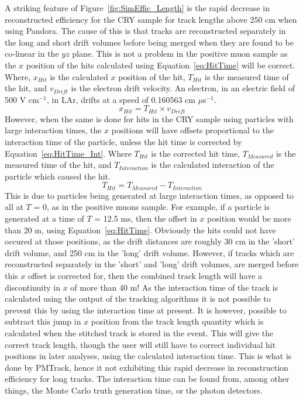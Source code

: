 A striking feature of Figure~\ref{fig:SimEffic_Length} is the rapid decrease in reconstructed efficiency for the CRY sample for track lengths above 250 cm when using Pandora. The cause of this is that tracks are reconstructed separately in the long and short drift volumes before being merged when they are found to be co-linear in the $yz$ plane. This is not a problem in the positive muon sample as the $x$ position of the hits calculated using Equation~\ref{eq:HitTime} will be correct. Where, $x_{Hit}$ is the calculated $x$ position of the hit, $T_{Hit}$ is the measured time of the hit, and $v_{Drift}$ is the electron drift velocity. An electron, in an electric field of 500 V cm$^{-1}$, in LAr, drifts at a speed of 0.160563 cm $\mu$s$^{-1}$.
\begin{equation}
   \label{eq:HitTime}
   x_{Hit} = T_{Hit} \times v_{Drift}
\end{equation}
However, when the same is done for hits in the CRY sample using particles with large interaction times, the $x$ positions will have offsets proportional to the interaction time of the particle, unless the hit time is corrected
by Equation~\ref{eq:HitTime_Int}. Where $T_{Hit}$ is the corrected hit time, $T_{Measured}$ is the measured time of the hit, and $T_{Interaction}$ is the calculated interaction of the particle which caused the hit.
\begin{equation}
   \label{eq:HitTime_Int}
   T_{Hit} = T_{Measured} - T_{Interaction}
\end{equation}
This is due to particles being generated at large interaction times, as opposed to all at $T$ = 0, as in the positive muons sample. For example, if a particle is generated at a time of $T$ = 12.5 ms, then the offset in $x$ position would be more than 20 m, using Equation~\ref{eq:HitTime}. Obviously the hits could not have occured at those positions, as the drift distances are roughly 30 cm in the 'short' drift volume, and 250 cm in the 'long' drift volume. However, if tracks which are reconstructed separately in the 'short' and 'long' drift volumes, are merged before this $x$ offset is corrected for, then the combined track length will have a discontinuity in $x$ of more than 40 m! As the interaction time of the track is calculated using the output of the tracking algorithms it is not possible to prevent this by using the interaction time at present. It is however, possible to subtract this jump in $x$ position from the track length quantity which is calculated when the stitched track is stored in the event. This will give the correct track length, though the user will still have to correct individual hit positions in later analyses, using the calculated interaction time. This is what is done by PMTrack, hence it not exhibiting this rapid decrease in reconstruction efficiency for long tracks. The interaction time can be found from, among other things, the Monte Carlo truth generation time, or the photon detectors.\\

